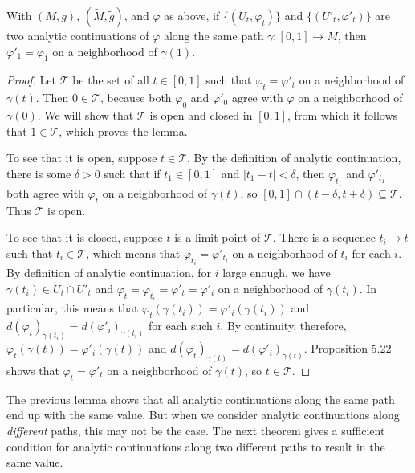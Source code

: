\begin{lemma}
\label{lem:uniqueness-analytic-continuation}
With $(M,g)$, $(\tilde{M},\tilde{g})$, and $\varphi$ as above, if $\{(U_t, \varphi_t)\}$ and $\{(U'_t, \varphi'_t)\}$ are two analytic continuations of $\varphi$ along the same path $\gamma: [0,1] \to M$, then $\varphi'_1 = \varphi_1$ on a neighborhood of $\gamma(1)$.

\begin{proof}
Let $\mathcal{T}$ be the set of all $t \in [0, 1]$ such that $\varphi_t = \varphi'_t$ on a neighborhood of $\gamma(t)$. Then $0 \in \mathcal{T}$, because both $\varphi_0$ and $\varphi'_0$ agree with $\varphi$ on a neighborhood of $\gamma(0)$. We will show that $\mathcal{T}$ is open and closed in $[0, 1]$, from which it follows that $1 \in \mathcal{T}$, which proves the lemma.

To see that it is open, suppose $t \in \mathcal{T}$. By the definition of analytic continuation, there is some $\delta > 0$ such that if $t_1 \in [0, 1]$ and $|t_1 - t| < \delta$, then $\varphi_{t_1}$ and $\varphi'_{t_1}$ both agree with $\varphi_t$ on a neighborhood of $\gamma(t)$, so $[0,1] \cap (t - \delta, t + \delta) \subseteq \mathcal{T}$. Thus $\mathcal{T}$ is open.

To see that it is closed, suppose $t$ is a limit point of $\mathcal{T}$. There is a sequence $t_i \to t$ such that $t_i \in \mathcal{T}$, which means that $\varphi_{t_i} = \varphi'_{t_i}$ on a neighborhood of $t_i$ for each $i$. By definition of analytic continuation, for $i$ large enough, we have $\gamma(t_i) \in U_t \cap U'_t$ and $\varphi_t = \varphi_{t_i} = \varphi'_t = \varphi'_i$ on a neighborhood of $\gamma(t_i)$. In particular, this means that $\varphi_t(\gamma(t_i)) = \varphi'_i(\gamma(t_i))$ and $d(\varphi_t)_{\gamma(t_i)} = d(\varphi'_i)_{\gamma(t_i)}$ for each such $i$. By continuity, therefore, $\varphi_t(\gamma(t)) = \varphi'_i(\gamma(t))$ and $d(\varphi_t)_{\gamma(t)} = d(\varphi'_i)_{\gamma(t)}$. Proposition 5.22 shows that $\varphi_t = \varphi'_t$ on a neighborhood of $\gamma(t)$, so $t \in \mathcal{T}$.
\end{proof}
\end{lemma}

The previous lemma shows that all analytic continuations along the same path end up with the same value. But when we consider analytic continuations along \emph{different} paths, this may not be the case. The next theorem gives a sufficient condition for analytic continuations along two different paths to result in the same value.

